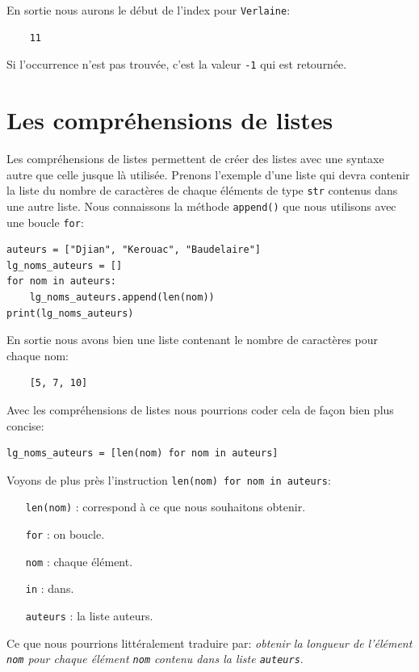 \documentclass[a4paper,11pt]{book}
\begin{document}
En sortie nous aurons le début de l'index pour \og \texttt{Verlaine}\fg{}:
\begin{verbatim}
    11
\end{verbatim}
\medskip

Si l'occurrence n'est pas trouvée, c'est la valeur \texttt{-1} qui est retournée.
\medskip

\section{Les compréhensions de listes}
Les compréhensions de listes permettent de créer des listes avec une syntaxe autre que celle jusque là utilisée. Prenons l'exemple d'une liste qui devra contenir la liste du nombre de caractères de chaque éléments de type \texttt{str} contenus dans une autre liste. Nous connaissons la méthode \texttt{append()} que nous utilisons avec une boucle \texttt{for}:
\begin{lstlisting}
auteurs = ["Djian", "Kerouac", "Baudelaire"]
lg_noms_auteurs = []
for nom in auteurs:
    lg_noms_auteurs.append(len(nom))
print(lg_noms_auteurs)
\end{lstlisting}
\medskip
 
En sortie nous avons bien une liste contenant le nombre de caractères pour chaque nom:
\begin{verbatim}
    [5, 7, 10]
\end{verbatim}
\medskip

Avec les compréhensions de listes nous pourrions coder cela de façon bien plus concise:
\begin{lstlisting}
lg_noms_auteurs = [len(nom) for nom in auteurs]
\end{lstlisting}
\medskip

Voyons de plus près l'instruction \texttt{len(nom) for nom in auteurs}:
\begin{itemize}
	\item[\texttt{len(nom)}]: correspond à ce que nous souhaitons obtenir.
	\item[\texttt{for}]: on boucle.
	\item[\texttt{nom}]: chaque élément.
	\item[\texttt{in}]: dans.
	\item[\texttt{auteurs}]: la liste auteurs.
\end{itemize}
\medskip

Ce que nous pourrions littéralement traduire par: \textit{obtenir la longueur de l'élément \texttt{nom} pour chaque élément \texttt{nom} contenu dans la liste \texttt{auteurs}}.
\medskip
\end{document}
